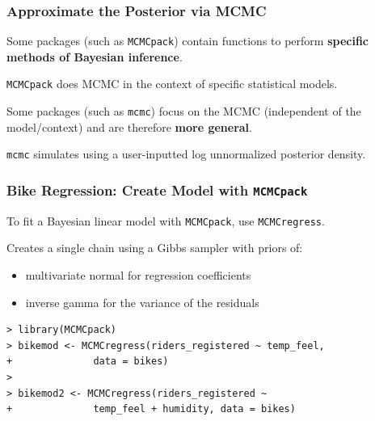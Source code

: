 \documentclass{beamer}
\begin{document}
\begin{frame}
 \frametitle{ Approximate the Posterior  via  MCMC     }



Some packages (such as \texttt{MCMCpack}) contain functions to perform \textbf{specific methods of Bayesian
        inference}. \\

\vspace{.3cm}

{\small \texttt{MCMCpack} does MCMC in the context of specific         statistical models.}

\vspace{1.3cm}

Some packages (such as \texttt{mcmc}) focus on the MCMC (independent of the model/context) and are therefore \textbf{more general}. \\

\vspace{.3cm}

{\small \texttt{mcmc} simulates using a user-inputted log unnormalized posterior density.}


\end{frame}




\begin{frame}[fragile]
 \frametitle{ Bike Regression: Create Model with \texttt{MCMCpack}    }
To fit a Bayesian linear model with \texttt{MCMCpack}, use \texttt{MCMCregress}.\\

\vspace{.5cm}

Creates a single chain using a Gibbs sampler with priors of:
\begin{itemize}
\item multivariate normal for regression coefficients
\item inverse gamma for the variance of the residuals
\end{itemize} 

\vspace{.5cm}


\begin{verbatim}
> library(MCMCpack)
> bikemod <- MCMCregress(riders_registered ~ temp_feel, 
+              data = bikes)
>
> bikemod2 <- MCMCregress(riders_registered ~ 
+              temp_feel + humidity, data = bikes)

 \end{verbatim}

\end{frame}
\end{document}
